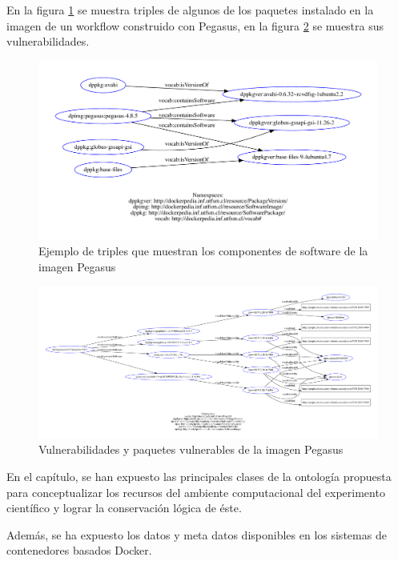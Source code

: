 En la figura  \ref{fig:packages-pegasus} se muestra triples de algunos de los paquetes instalado en la imagen de un workflow construido con Pegasus, en la figura \ref{fig:vulnerability-pegasus} se muestra sus vulnerabilidades.
\begin{figure}[hb]
    \includegraphics[width=\textwidth]{Figures/packages}
     \caption[Paquetes de la imagen Pegasus]{Ejemplo de triples que muestran los componentes de software de la imagen Pegasus}
    \label{fig:packages-pegasus}
\end{figure}

\begin{figure}[hb]
    \hspace*{-4cm}   
    \includegraphics[width=1.3\textwidth]{Figures/packages-vuln}
      \caption[Paquetes y vulnerabilidades de la imagen Pegasus]{Vulnerabilidades y paquetes vulnerables de la imagen Pegasus}
    \label{fig:vulnerability-pegasus}
\end{figure}

En el capítulo, se han expuesto las principales clases de la ontología propuesta para conceptualizar los recursos del ambiente computacional del experimento científico y lograr la conservación lógica de éste.

Además, se ha expuesto los datos y meta datos disponibles en los sistemas de contenedores basados Docker. 

